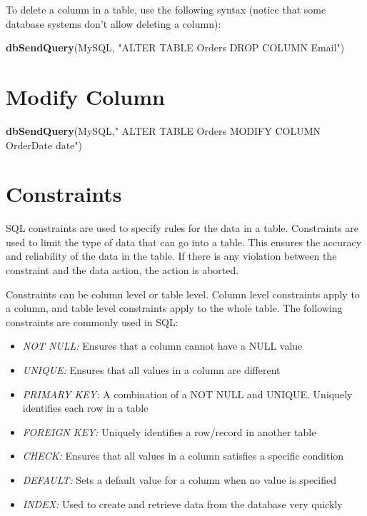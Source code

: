 \documentclass[
]{book}
\newenvironment{Shaded}{\begin{snugshade}}{\end{snugshade}}
\newcommand{\FunctionTok}[1]{\textcolor[rgb]{0.13,0.29,0.53}{\textbf{#1}}}
\newcommand{\NormalTok}[1]{#1}
\newcommand{\StringTok}[1]{\textcolor[rgb]{0.31,0.60,0.02}{#1}}
\providecommand{\tightlist}{%
  \setlength{\itemsep}{0pt}\setlength{\parskip}{0pt}}
\begin{document}
To delete a column in a table, use the following syntax (notice that some database systems don't allow deleting a column):

\begin{Shaded}
\begin{Highlighting}[]
\FunctionTok{dbSendQuery}\NormalTok{(MySQL, }\StringTok{"ALTER TABLE Orders}
\StringTok{                   DROP COLUMN Email"}\NormalTok{)}
\end{Highlighting}
\end{Shaded}

\hypertarget{modify-column}{%
\section{Modify Column}\label{modify-column}}

\begin{Shaded}
\begin{Highlighting}[]
\FunctionTok{dbSendQuery}\NormalTok{(MySQL,}\StringTok{" ALTER TABLE Orders}
\StringTok{                  MODIFY COLUMN OrderDate date"}\NormalTok{)}
\end{Highlighting}
\end{Shaded}

\hypertarget{constraints}{%
\section{Constraints}\label{constraints}}

SQL constraints are used to specify rules for the data in a table. Constraints are used to limit the type of data that can go into a table. This ensures the accuracy and reliability of the data in the table. If there is any violation between the constraint and the data action, the action is aborted.

Constraints can be column level or table level. Column level constraints apply to a column, and table level constraints apply to the whole table. The following constraints are commonly used in SQL:

\begin{itemize}
\tightlist
\item
  \emph{NOT NULL:} Ensures that a column cannot have a NULL value
\item
  \emph{UNIQUE:} Ensures that all values in a column are different
\item
  \emph{PRIMARY KEY:} A combination of a NOT NULL and UNIQUE. Uniquely identifies each row in a table
\item
  \emph{FOREIGN KEY:} Uniquely identifies a row/record in another table
\item
  \emph{CHECK:} Ensures that all values in a column satisfies a specific condition
\item
  \emph{DEFAULT:} Sets a default value for a column when no value is specified
\item
  \emph{INDEX:} Used to create and retrieve data from the database very quickly
\end{itemize}
\end{document}
